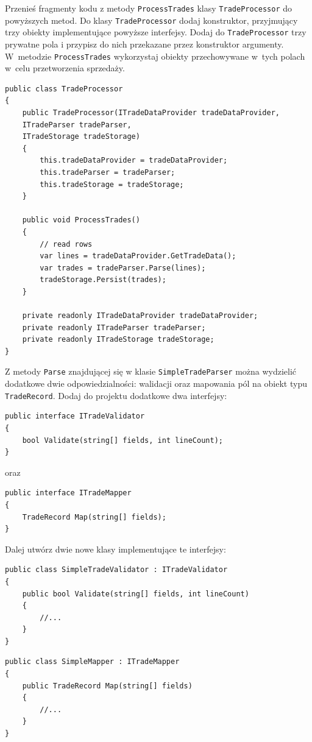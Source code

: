 Przenieś fragmenty kodu z metody \texttt{ProcessTrades} klasy \texttt{TradeProcessor} do powyższych metod. Do klasy \texttt{TradeProcessor} dodaj konstruktor, przyjmujący trzy obiekty implementujące powyższe interfejsy. Dodaj do \texttt{TradeProcessor} trzy prywatne pola i przypisz do nich przekazane przez konstruktor argumenty. W~metodzie \texttt{ProcessTrades} wykorzystaj obiekty przechowywane w~tych polach w~celu przetworzenia sprzedaży. 
\begin{lstlisting}
public class TradeProcessor
{
	public TradeProcessor(ITradeDataProvider tradeDataProvider,
	ITradeParser tradeParser,
	ITradeStorage tradeStorage)
	{
		this.tradeDataProvider = tradeDataProvider;
		this.tradeParser = tradeParser;
		this.tradeStorage = tradeStorage;
	}

	public void ProcessTrades()
	{
		// read rows
		var lines = tradeDataProvider.GetTradeData();
		var trades = tradeParser.Parse(lines);
		tradeStorage.Persist(trades);
	}
	
	private readonly ITradeDataProvider tradeDataProvider;
	private readonly ITradeParser tradeParser;
	private readonly ITradeStorage tradeStorage;
}
\end{lstlisting}

Z metody \texttt{Parse} znajdującej się w klasie \texttt{SimpleTradeParser} można wydzielić dodatkowe dwie odpowiedzialności: walidacji oraz mapowania pól na obiekt typu \texttt{TradeRecord}. Dodaj do projektu dodatkowe dwa interfejsy:
\begin{lstlisting}
public interface ITradeValidator
{
	bool Validate(string[] fields, int lineCount);
}
\end{lstlisting}
oraz 
\begin{lstlisting}
public interface ITradeMapper
{
	TradeRecord Map(string[] fields);
}	
\end{lstlisting}

Dalej utwórz dwie nowe klasy implementujące te interfejsy:
\begin{lstlisting}
public class SimpleTradeValidator : ITradeValidator
{	
	public bool Validate(string[] fields, int lineCount)
	{
		//...
	}
}
\end{lstlisting}
\begin{lstlisting}
public class SimpleMapper : ITradeMapper
{
	public TradeRecord Map(string[] fields)
	{
		//...
	}
}	
\end{lstlisting}

